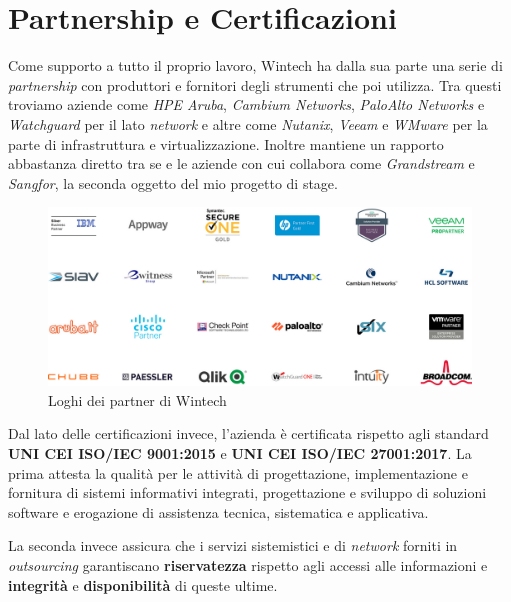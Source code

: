 \section{Partnership e Certificazioni}

Come supporto a tutto il proprio lavoro, Wintech ha dalla sua parte una serie di \emph{partnership} con produttori e fornitori degli strumenti che poi utilizza. Tra questi troviamo aziende come \emph{HPE Aruba}, \emph{Cambium Networks}, \emph{PaloAlto Networks} e \emph{Watchguard} per il lato \emph{network} e altre come \emph{Nutanix}, \emph{Veeam} e \emph{WMware} per la parte di infrastruttura e virtualizzazione.\cite{site:wtc-dati} Inoltre mantiene un rapporto abbastanza diretto tra se e le aziende con cui collabora come \emph{Grandstream} e \emph{Sangfor}, la seconda oggetto del mio progetto di stage.

\begin{figure}[htbp]
    \centering
    \includegraphics[width=0.8\linewidth]{images/wtc/partner.png}
    \caption{Loghi dei partner di Wintech}
    \label{fig:partner-wtc}
\end{figure}

Dal lato delle certificazioni invece, l'azienda è certificata rispetto agli standard \textbf{UNI CEI ISO/IEC 9001:2015} e \textbf{UNI CEI ISO/IEC 27001:2017}. La prima attesta la qualità per le attività di progettazione, implementazione e fornitura di sistemi informativi integrati, progettazione e sviluppo di soluzioni software e erogazione di assistenza tecnica, sistematica e applicativa.

La seconda invece assicura che i servizi sistemistici e di \emph{network} forniti in \emph{outsourcing} garantiscano \textbf{riservatezza} rispetto agli accessi alle informazioni e \textbf{integrità} e \textbf{disponibilità} di queste ultime.

